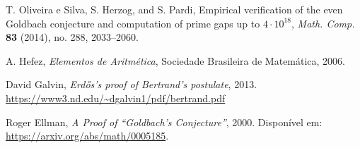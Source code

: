 \documentclass[a4paper,11pt]{article}
\theoremstyle{definition}
\theoremstyle{remark}
\begin{document}
\begin{otherlanguage}{brazil}
\begin{thebibliography}{9}
		T. Oliveira e Silva, S. Herzog, and S. Pardi,
		Empirical verification of the even Goldbach conjecture and computation of prime gaps up to \(4 \cdot 10^{18}\),
		\textit{Math. Comp.} \textbf{83} (2014), no. 288, 2033--2060.
		
		A. Hefez,
		\textit{Elementos de Aritmética},
		Sociedade Brasileira de Matemática, 2006.
		
		David Galvin,
		\textit{Erdős's proof of Bertrand's postulate},
		2013.
		\url{https://www3.nd.edu/~dgalvin1/pdf/bertrand.pdf}
		
		Roger Ellman,
		\emph{A Proof of ``Goldbach's Conjecture''},
		2000. Disponível em: \url{https://arxiv.org/abs/math/0005185}.
		
		
		
		
		
		
	\end{thebibliography}
    \end{otherlanguage}
	
\end{document}
